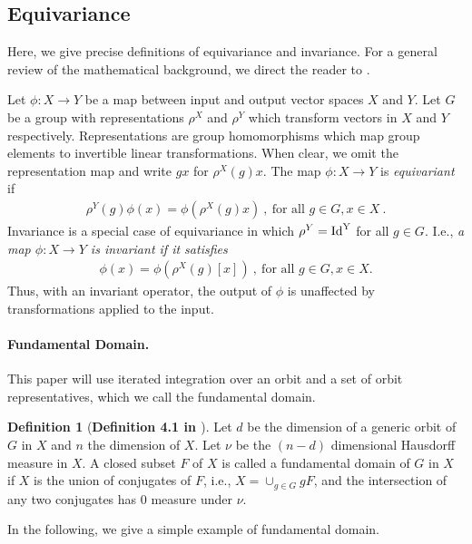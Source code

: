 \documentclass[10pt]{article} %
\newenvironment{customdef}[1][]
{%
    \begin{defn}[\normalfont\textbf{#1}] %
}
{%
    \end{defn}
}
\theoremstyle{definition}
\newtheorem{defn}{Definition}
\begin{document}
\subsection{Equivariance}

Here, we give precise definitions of equivariance and invariance. For a general review of the mathematical background, we direct the reader to \cite{Artin1998, hall2013lie, esteves2020theoretical}.

Let $\phi: X \rightarrow Y$ be a map between input and output vector spaces $X$ and $Y$.
Let $G$ be a group with representations $\rho^{X}$ and $\rho^{Y}$ which transform vectors in $X$ and $Y$ respectively. Representations are group homomorphisms which map group elements to invertible linear transformations. When clear, we omit the representation map and write $gx$ for $\rho^{X}(g)x$.  The map $\phi: X \rightarrow Y$ is \emph{equivariant} if 
\begin{align*}
\label{eq:equivariance_app}
    \rho^{Y}(g)\phi(x)=\phi(\rho^{X}(g)x) \ , \ \text{for all } g\in G, x \in X \ .
\end{align*}
%
Invariance is a special case of equivariance in which $\rho^{Y} = \rm{Id}^{Y}$ for all $g \in G$. I.e.,  \textit{a map $\phi: X \rightarrow Y$ is \emph{invariant} if it satisfies}
\begin{align*}
    \phi(x)=\phi(\rho^{X}(g)[x]) \ , \ \text{for all } g\in G, x \in X .
\end{align*}
Thus, with an invariant operator, the output of $\phi$ is unaffected by transformations applied to the input. 

\paragraph{Fundamental Domain.} This paper will use iterated integration over an orbit and a set of orbit representatives, which we call the fundamental domain.

\begin{customdef}[Definition 4.1 in \cite{wang2024general}] Let $d$ be the dimension of a generic orbit of $G$ in $X$ and $n$ the dimension of $X$. Let $\nu$ be the $(n - d)$ dimensional Hausdorff measure in $X$. A closed subset $F$ of $X$ is called a fundamental domain of $G$ in $X$ if $X$ is the union of conjugates of $F$, i.e., $X = \cup_{g \in G}gF$, and the intersection of any two
conjugates has 0 measure under $\nu$.    
\end{customdef}

In the following, we give a simple example of fundamental domain.
\end{document}
